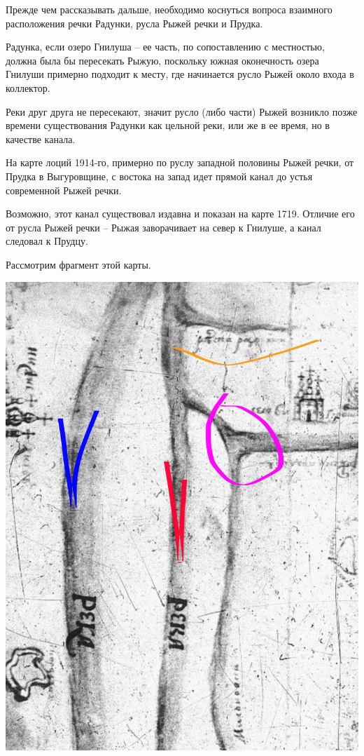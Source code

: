 Прежде чем рассказывать дальше, необходимо коснуться вопроса взаимного расположения речки Радунки, русла Рыжей речки и Прудка. 

Радунка, если озеро Гнилуша – ее часть, по сопоставлению с местностью, должна была бы пересекать Рыжую, поскольку южная оконечность озера Гнилуши примерно подходит к месту, где начинается русло Рыжей около входа в коллектор.

Реки друг друга не пересекают, значит русло (либо части) Рыжей возникло позже времени существования Радунки как цельной реки, или же в ее время, но в качестве канала.

На карте лоций 1914-го, примерно по руслу западной половины Рыжей речки, от Прудка в Выгуровщине, с востока на запад идет прямой канал до устья современной Рыжей речки. 

Возможно, этот канал существовал издавна и показан на карте 1719. Отличие его от русла Рыжей речки – Рыжая заворачивает на север к Гнилуше, а канал следовал к Прудцу.  

Рассмотрим фрагмент этой карты.

\begin{center}
\includegraphics[width=\linewidth]{chast-gorodki/rud/1719-cross.jpg}
\end{center}

